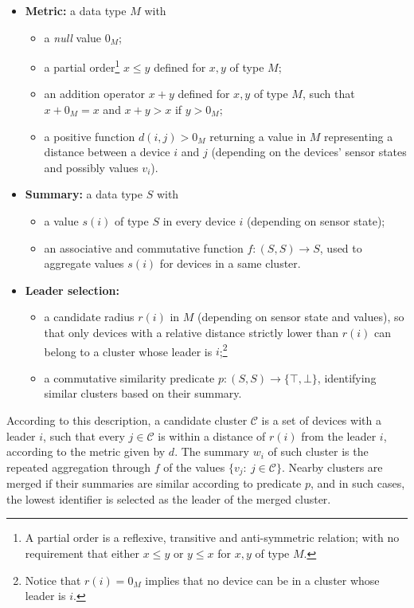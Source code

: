 \begin{itemize}
	\item \textbf{Metric:} a data type $M$ with
	\begin{itemize}
		\item a \emph{null} value $0_M$;
		\item a partial order\footnote{A partial order is a reflexive, transitive and anti-symmetric relation; with no requirement that either $x \leq y$ or $y \leq x$ for $x,y$ of type $M$.} $x \leq y$ defined for $x,y$ of type $M$;
		\item an addition operator $x + y$ defined for $x,y$ of type $M$, such that $x + 0_M = x$ and $x + y > x$ if $y > 0_M$;
		\item a positive function $d(i, j) > 0_M$ returning a value in $M$ representing a distance between a device $i$ and $j$ (depending on the devices' sensor states and possibly values $v_i$). 
	\end{itemize}
	\item \textbf{Summary:} a data type $S$ with
	\begin{itemize}
		\item a value $s(i)$ of type $S$ in every device $i$ (depending on sensor state);
		\item an associative and commutative function $f : (S,S) \to S$, used to aggregate values $s(i)$ for devices in a same cluster.
	\end{itemize}
	\item \textbf{Leader selection:}
	\begin{itemize}
		\item a candidate radius $r(i)$ in $M$ (depending on sensor state and values), so that only devices with a relative distance strictly lower than $r(i)$ can belong to a cluster whose leader is $i$;\footnote{Notice that $r(i) = 0_M$ implies that no device can be in a cluster whose leader is $i$.}
		\item a commutative similarity predicate $p : (S,S) \to \{\top, \bot\}$, identifying similar clusters based on their summary.
	\end{itemize}
\end{itemize}
According to this description, a candidate cluster $\mathcal{C}$ is a set of devices with a leader $i$,
 such that every $j \in \mathcal{C}$ is within a distance of $r(i)$ from the leader $i$,
 according to the metric given by $d$.
 The summary $w_i$ of such cluster is the repeated aggregation through $f$ of the values $\{v_j : ~ j \in \mathcal{C}\}$.
 Nearby clusters are merged if their summaries are similar according to predicate $p$,
 and in such cases, the lowest identifier is selected as the leader of the merged cluster.

